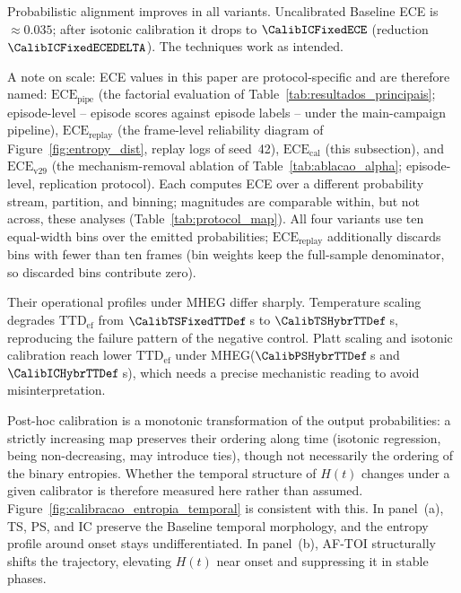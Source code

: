\documentclass[a4paper,fleqn]{cas-dc}
\newcommand{\AFTOI}{\mbox{AF-TOI}\xspace}
\newcommand{\MHEG}{\mbox{MHEG}\xspace}
\begin{document}
Probabilistic alignment improves in all variants. Uncalibrated Baseline ECE is
$\approx 0.035$; after isotonic calibration it drops to $\CalibICFixedECE$
(reduction $\CalibICFixedECEDELTA$). The techniques work as intended.

{\color{\revcolor}A note on scale: ECE values in this paper are
protocol-specific and are therefore named: $\mathrm{ECE}_{\mathrm{pipe}}$
(the factorial evaluation of Table~\ref{tab:resultados_principais};
episode-level -- episode scores against episode labels -- under the
main-campaign pipeline),
$\mathrm{ECE}_{\mathrm{replay}}$ (the frame-level reliability diagram of
Figure~\ref{fig:entropy_dist}, replay logs of seed~42),
$\mathrm{ECE}_{\mathrm{cal}}$ (this subsection), and
$\mathrm{ECE}_{\mathrm{v29}}$ (the mechanism-removal ablation of
Table~\ref{tab:ablacao_alpha}; episode-level, replication protocol). Each computes ECE over
a different probability stream, partition, and binning; magnitudes are
comparable within, but not across, these analyses
(Table~\ref{tab:protocol_map}). All four variants use ten equal-width bins
over the emitted probabilities; $\mathrm{ECE}_{\mathrm{replay}}$ additionally
discards bins with fewer than ten frames (bin weights keep the full-sample
denominator, so discarded bins contribute zero).}

Their operational profiles under \MHEG differ sharply. Temperature scaling
degrades $\mathrm{TTD}_{\mathrm{ef}}$ from $\CalibTSFixedTTDef$\,s to
$\CalibTSHybrTTDef$\,s, reproducing the failure pattern of the negative control.
Platt scaling and isotonic calibration reach lower $\mathrm{TTD}_{\mathrm{ef}}$
under \MHEG ($\CalibPSHybrTTDef$\,s and $\CalibICHybrTTDef$\,s), which needs a
precise mechanistic reading to avoid misinterpretation.

{\color{\revcolor}Post-hoc calibration is a monotonic transformation of the
output probabilities: a strictly increasing map preserves their ordering
along time (isotonic regression, being non-decreasing, may introduce ties),
though not necessarily the ordering of the binary entropies. Whether the temporal
structure of $H(t)$ changes under a given calibrator is therefore measured
here rather than assumed.}
Figure~\ref{fig:calibracao_entropia_temporal} is consistent with this. In
panel~(a), TS, PS, and IC preserve the Baseline temporal morphology, and the
entropy profile around onset stays undifferentiated. In panel~(b), \AFTOI
structurally shifts the trajectory, elevating $H(t)$ near onset and
suppressing it in stable phases.
\end{document}
